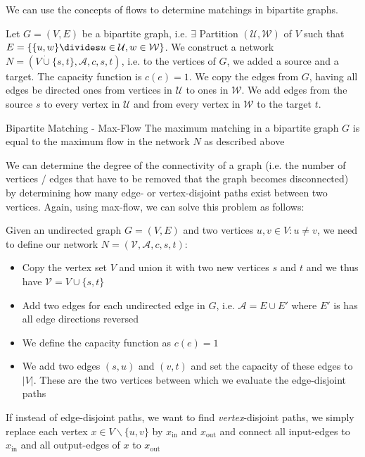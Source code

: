 \newpage
{}

We can use the concepts of flows to determine matchings in bipartite graphs.

Let $G = (V, E)$ be a bipartite graph, i.e. $\exists$ Partition $(\mathcal{U}, \mathcal{W})$ of $V$ such that $E = \{\{u, w\} \divides u \in \mathcal{U}, w \in \mathcal{W}\}$.
We construct a network $N = (V \dot{\cup} \{s, t\}, \mathcal{A}, c, s, t)$, i.e. to the vertices of $G$, we added a source and a target.
The capacity function is $c(e) = 1$.
We copy the edges from $G$, having all edges be directed ones from vertices in $\mathcal{U}$ to ones in $\mathcal{W}$.
We add edges from the source $s$ to every vertex in $\mathcal{U}$ and from every vertex in $\mathcal{W}$ to the target $t$.

\begin{lemma}[]{Bipartite Matching - Max-Flow}
    The maximum matching in a bipartite graph $G$ is equal to the maximum flow in the network $N$ as described above
\end{lemma}



We can determine the degree of the connectivity of a graph (i.e. the number of vertices / edges that have to be removed that the graph becomes disconnected) by determining how many edge- or vertex-disjoint paths exist between two vertices.
Again, using max-flow, we can solve this problem as follows:

Given an undirected graph $G = (V, E)$ and two vertices $u, v \in V : u \neq v$, we need to define our network $N = (\mathcal{V}, \mathcal{A}, c, s, t)$:
\begin{itemize}
    \item Copy the vertex set $V$ and union it with two new vertices $s$ and $t$ and we thus have $\mathcal{V} = V \cup \{s, t\}$
    \item Add two edges for each undirected edge in $G$, i.e. $\mathcal{A} = E \cup E'$ where $E'$ is has all edge directions reversed
    \item We define the capacity function as $c(e) = 1$
    \item We add two edges $(s, u)$ and $(v, t)$ and set the capacity of these edges to $|V|$. These are the two vertices between which we evaluate the edge-disjoint paths
\end{itemize}

If instead of edge-disjoint paths, we want to find \textit{vertex}-disjoint paths, we simply replace each vertex $x \in V\backslash\{u, v\}$ by $x_{\text{in}}$ and $x_{\text{out}}$ and connect all input-edges to $x_{\text{in}}$ and all output-edges of $x$ to $x_{\text{out}}$


